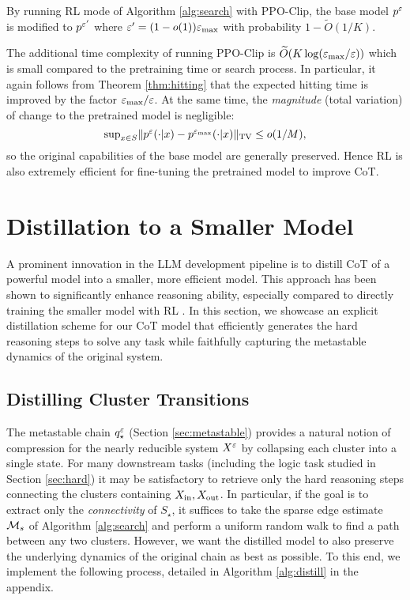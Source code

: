 \begin{prop}
By running RL mode of Algorithm \ref{alg:search} with PPO-Clip, the base model $p^\varepsilon$ is modified to $p^{\varepsilon'}$ where $\varepsilon'=(1-o(1))\varepsilon_{\max}$ with probability $1-\widetilde{O}(1/K)$.
\end{prop}

The additional time complexity of running PPO-Clip is $\widetilde{O}(K\log(\varepsilon_{\max}/\varepsilon))$ which is small compared to the pretraining time or search process. In particular, it again follows from Theorem \ref{thm:hitting} that the expected hitting time is improved by the factor $\varepsilon_{\max}/\varepsilon$. At the same time, the \emph{magnitude} (total variation) of change to the pretrained model is negligible:
\begin{equation*}
\textstyle \sup_{x\in S}\lVert p^\varepsilon(\cdot|x) - p^{\varepsilon_{\max}}(\cdot|x)\rVert_{\operatorname{TV}} \le o(1/M),
\end{equation*}
so the original capabilities of the base model are generally preserved. Hence {RL is also extremely efficient for fine-tuning the pretrained model to improve CoT.} 


\section{Distillation to a Smaller Model}\label{sec:distill}


A prominent innovation in the LLM development pipeline is to distill CoT of a powerful model into a smaller, more efficient model. This approach has been shown to significantly enhance reasoning ability, especially compared to directly training the smaller model with RL \citep{shridhar2022distilling,hsieh2023distilling,gandhi2024stream,guo2025deepseek}. In this section, we showcase an explicit distillation scheme for our CoT model that efficiently generates the hard reasoning steps to solve any task while faithfully capturing the metastable dynamics of the original system.


\subsection{Distilling Cluster Transitions}


The metastable chain $q_\star^\varepsilon$ (Section \ref{sec:metastable}) provides a natural notion of compression for the nearly reducible system $X^\varepsilon$ by collapsing each cluster into a single state. For many downstream tasks (including the logic task studied in Section \ref{sec:hard}) it may be satisfactory to retrieve only the hard reasoning steps connecting the clusters containing $X_{\operatorname{in}},X_{\operatorname{out}}$. In particular, if the goal is to extract only the \emph{connectivity} of $S_\star$, it suffices to take the sparse edge estimate $\mathcal{M}_s$ of Algorithm \ref{alg:search} and perform a uniform random walk to find a path between any two clusters. However, we want the distilled model to also preserve the underlying dynamics of the original chain as best as possible. To this end, we implement the following process, detailed in Algorithm \ref{alg:distill} in the appendix.

